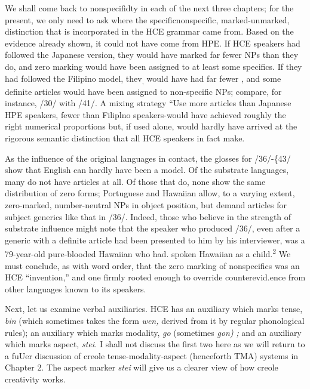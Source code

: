 We shall come back to nonspecifidty in each of the next three chapters; for the present, we only need to ask where the specific\-nonspecific, marked-unmarked, distinction that is incorporated in the HCE grammar came from. Based on the evidence already shown, it could not have come from HPE. If HCE speakers had followed the Japanese version, they would have marked far fewer NPs than they do, and zero marking would have been assigned to at least some specifics. If they had followed the Filipino model, thev\textsubscript{,}\textsubscript{ }would have had far fewer \zeros, and some definite articles would have been assigned to non-specific NPs; compare, for instance, /30/ with /41/. A mixing strategy\- ``Use more articles than Japanese HPE speakers, fewer than Filiplno speakers{\textquotedbl}-would have achieved roughly the right numerical propor\-tions but, if used alone, would hardly have arrived at the rigorous semantic distinction that all HCE speakers in fact make.

As the influence of the original languages in contact, the glosses for /36/-\{43/ show that English can hardly have been a model. Of the substrate languages, many do not have articles at all. Of those that do, none show the same distribution of zero forms; Portuguese and Hawaiian allow, to a varying extent, zero-marked, number-neutral NPs in object position, but demand articles for subject generics like that in /36/. Indeed, those who believe in the strength of substrate
influence might note that the speaker who produced /36/, even after a generic with a definite article had been presented to him by his inter\-viewer, was a 79-year-old pure-blooded Hawaiian who had. spoken Hawaiian as a child.\textsuperscript{2} We must conclude, as with word order, that the zero marking of nonspecifics was an HCE ``invention,'' and one firmly rooted enough to override counterevid.ence from other languages known to its speakers.

Next, let us examine verbal auxiliaries. HCE has an auxiliary which marks tense, \textit{bin} (which sometimes takes the form \textit{wen,} derived from it by regular phonological rules); an auxiliary which marks modal\-ity, \textit{go }(sometimes \textit{go}\textit{n}\textit{)} \textit{; }and an auxiliary which marks aspect, \textit{stei.} I shall not discuss the first two here as we will return to a fuUer discus\-sion of creole tense-modality-aspect (henceforth TMA) systems in Chapter 2. The aspect marker \textit{stei} will give us a clearer view of how creole creativity works.

